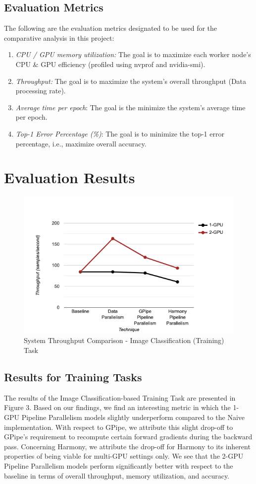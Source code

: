 \documentclass[conference]{IEEEtran}
\begin{document}
\subsection{Evaluation Metrics}
The following are the evaluation metrics designated to be used for the comparative analysis in this project:
\begin{enumerate}
    \item \textit{CPU / GPU memory utilization:} The goal is to maximize each worker node's CPU \& GPU efficiency (profiled using nvprof and nvidia-smi).
    \item \textit{Throughput:} The goal is to maximize the system's overall throughput (Data processing rate).
    \item \textit{Average time per epoch}: The goal is the minimize the system's average time per epoch.
    \item \textit{Top-1 Error Percentage (\%)}: The goal is to minimize the top-1 error percentage, i.e., maximize overall accuracy.
\end{enumerate}

\section{Evaluation Results}
\begin{figure}[h]
	\centering
	\includegraphics[scale=0.42]{FinalResultGraph.png}
	\caption{System Throughput Comparison - Image Classification (Training) Task}
	\label{fig}
\end{figure}
\subsection{Results for Training Tasks}
The results of the Image Classification-based Training Task are presented in Figure 3. Based on our findings, we find an interesting metric in which the 1-GPU Pipeline Parallelism models slightly underperform compared to the Naive implementation. With respect to GPipe, we attribute this slight drop-off to GPipe's requirement to recompute certain forward gradients during the backward pass. Concerning Harmony, we attribute the drop-off for Harmony to its inherent properties of being viable for multi-GPU settings only. We see that the 2-GPU Pipeline Parallelism models perform significantly better with respect to the baseline in terms of overall throughput, memory utilization, and accuracy. \\
\end{document}
